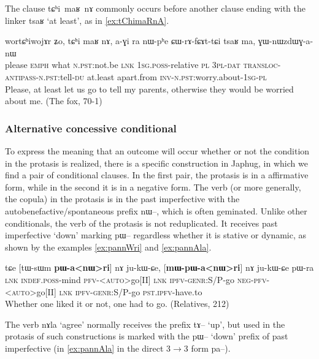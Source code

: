 \documentclass[oldfontcommands,oneside,a4paper,11pt]{article}
\newcommand{\ipa}[1]{{\phon \mbox{#1}}} %
\begin{document}
The clause \ipa{tɕʰi maʁ nɤ} commonly occurs before another clause ending with the linker \ipa{tsaʁ} `at least', as in \ref{ex:tChimaRnA}.
\begin{exe}
\ex  \label{ex:tChimaRnA}
\gll
\ipa{wortɕʰiwojɤr} 	\ipa{ʑo,} 	\ipa{tɕʰi} 	\ipa{maʁ} 	\ipa{nɤ,} 	\ipa{a-ɣi} 	\ipa{ra} 	\ipa{nɯ-pʰe} 	\ipa{ɕɯ-rɤ-fɕɤt-tɕi} 	\ipa{tsaʁ} 	\ipa{ma,} 	\ipa{ɣɯ-nɯzdɯɣ-a-nɯ} 	 \\
please \textsc{emph} what \textsc{n.pst}:not.be \textsc{lnk} \textsc{1sg.poss}-relative \textsc{pl} \textsc{3pl-dat} \textsc{transloc-antipass-n.pst}:tell-\textsc{du} at.least  apart.from \textsc{inv}-\textsc{n.pst}:worry.about-\textsc{1sg-pl} \\
\glt Please, at least let us go to tell my parents, otherwise they would be worried about me. (The fox, 70-1)

\end{exe}
\subsubsection{Alternative concessive conditional}
To express the meaning that an outcome will occur whether or not the condition in the protasis is realized, there is a specific construction in Japhug, in which we find a pair of conditional clauses. In the first pair, the protasis is in a affirmative form, while in the second it is in a negative form. The verb (or more generally, the copula) in the protasis  is in the past imperfective with the autobenefactive/spontaneous prefix \ipa{nɯ--}, which is often geminated. Unlike other conditionals, the verb of the protasis is not reduplicated. It receives past imperfective `down' marking \ipa{pɯ}-- regardless whether it is stative or dynamic, as shown by the examples \ref{ex:pannWri} and \ref{ex:pannAla}.


\begin{exe}
\ex  \label{ex:pannWri}
\gll
\ipa{tɕe}  	[\ipa{tɯ-sɯm}  	\textbf{\ipa{pɯ-a<nɯ>ri}}]  	\ipa{nɤ}  	\ipa{ju-kɯ-ɕe,}  	[\textbf{\ipa{mɯ-pɯ-a<nɯ>ri}}]  	\ipa{nɤ}  	\ipa{ju-kɯ-ɕe}  	\ipa{pɯ-ra}  \\
\textsc{lnk} \textsc{indef.poss}-mind  \textsc{pfv-<auto>}go[II] \textsc{lnk} \textsc{ipfv-genr}:S/P-go \textsc{neg-pfv-<auto>}go[II] \textsc{lnk} \textsc{ipfv-genr}:S/P-go \textsc{pst.ipfv}-have.to \\
\glt Whether one liked it or not, one had to go. (Relatives, 212)
\end{exe}

The verb \ipa{nɤla} `agree' normally receives the prefix \ipa{tɤ}-- `up', but used in the protasis of such constructions is marked with the \ipa{pɯ}-- `down' prefix of past imperfective (in \ref{ex:pannAla} in the direct 3$\rightarrow$3 form \ipa{pa}--).
\end{document}
